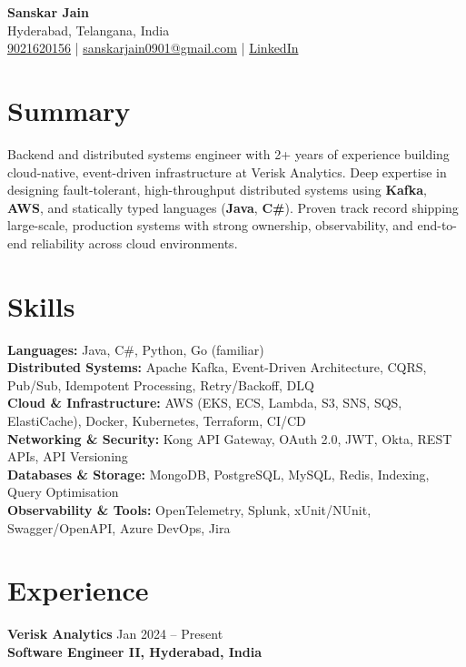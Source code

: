 \documentclass[letterpaper,10pt]{article}
\begin{document}
\begin{center}
    {\LARGE \textbf{Sanskar Jain}} \\
    Hyderabad, Telangana, India \\
    \href{tel:9021620156}{9021620156} \;|\;
    \href{mailto:sanskarjain0901@gmail.com}{sanskarjain0901@gmail.com} \;|\;
    \href{https://www.linkedin.com/in/sanskar-jain0901/}{LinkedIn}
\end{center}

\vspace{3pt}

\section*{Summary}
Backend and distributed systems engineer with 2+ years of experience building cloud-native, event-driven infrastructure at Verisk Analytics.
Deep expertise in designing fault-tolerant, high-throughput distributed systems using \textbf{Kafka}, \textbf{AWS}, and statically typed languages (\textbf{Java}, \textbf{C\#}).
Proven track record shipping large-scale, production systems with strong ownership, observability, and end-to-end reliability across cloud environments.

\section*{Skills}
\textbf{Languages:} Java, C\#, Python, Go (familiar) \\
\textbf{Distributed Systems:} Apache Kafka, Event-Driven Architecture, CQRS, Pub/Sub, Idempotent Processing, Retry/Backoff, DLQ \\
\textbf{Cloud \& Infrastructure:} AWS (EKS, ECS, Lambda, S3, SNS, SQS, ElastiCache), Docker, Kubernetes, Terraform, CI/CD \\
\textbf{Networking \& Security:} Kong API Gateway, OAuth 2.0, JWT, Okta, REST APIs, API Versioning \\
\textbf{Databases \& Storage:} MongoDB, PostgreSQL, MySQL, Redis, Indexing, Query Optimisation \\
\textbf{Observability \& Tools:} OpenTelemetry, Splunk, xUnit/NUnit, Swagger/OpenAPI, Azure DevOps, Jira

\section*{Experience}

\textbf{Verisk Analytics} \hfill Jan 2024 -- Present \\
\textbf{Software Engineer II, Hyderabad, India}
\end{document}
